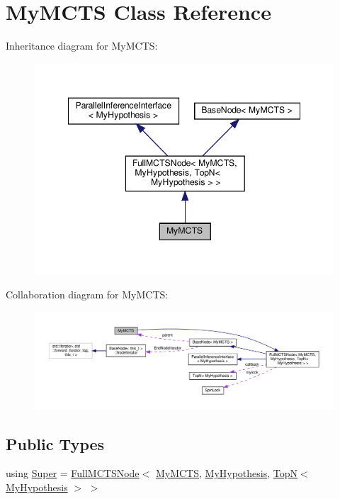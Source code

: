 \hypertarget{class_my_m_c_t_s}{}\section{My\+M\+C\+TS Class Reference}
\label{class_my_m_c_t_s}


Inheritance diagram for My\+M\+C\+TS\+:
\nopagebreak
\begin{figure}[H]
\begin{center}
\leavevmode
\includegraphics[width=348pt]{class_my_m_c_t_s__inherit__graph}
\end{center}
\end{figure}


Collaboration diagram for My\+M\+C\+TS\+:
\nopagebreak
\begin{figure}[H]
\begin{center}
\leavevmode
\includegraphics[width=350pt]{class_my_m_c_t_s__coll__graph}
\end{center}
\end{figure}
\subsection*{Public Types}
\begin{DoxyCompactItemize}
\item 
using \hyperlink{class_my_m_c_t_s_aa963e98a4484e701a2ebe3600da6dfaf}{Super} = \hyperlink{class_full_m_c_t_s_node}{Full\+M\+C\+T\+S\+Node}$<$ \hyperlink{class_my_m_c_t_s}{My\+M\+C\+TS}, \hyperlink{class_my_hypothesis}{My\+Hypothesis}, \hyperlink{class_top_n}{TopN}$<$ \hyperlink{class_my_hypothesis}{My\+Hypothesis} $>$ $>$
\end{DoxyCompactItemize}
